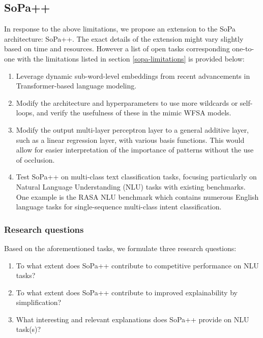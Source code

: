 \subsection{SoPa++}

In response to the above limitations, we propose an extension to the SoPa architecture: SoPa++. The exact details of the extension might vary slightly based on time and resources. However a list of open tasks corresponding one-to-one with the limitations listed in section \ref{sopa-limitations} is provided below:

\begin{enumerate}
  \item Leverage dynamic sub-word-level embeddings from recent advancements in Transformer-based language modeling.
  \item Modify the architecture and hyperparameters to use more wildcards or self-loops, and verify the usefulness of these in the mimic WFSA models.
  \item Modify the output multi-layer perceptron layer to a general additive layer, such as a linear regression layer, with various basis functions. This would allow for easier interpretation of the importance of patterns without the use of occlusion.
  \item Test SoPa++ on multi-class text classification tasks, focusing particularly on Natural Language Understanding (NLU) tasks with existing benchmarks. One example is the RASA NLU benchmark \citep{bocklisch2017rasa} which contains numerous English language tasks for single-sequence multi-class intent classification. 
\end{enumerate}

\subsubsection{Research questions}

Based on the aforementioned tasks, we formulate three research questions:

\begin{enumerate}
  \item To what extent does SoPa++ contribute to competitive performance on NLU tasks?
  \item To what extent does SoPa++ contribute to improved explainability by simplification?
  \item What interesting and relevant explanations does SoPa++ provide on NLU task(s)?
\end{enumerate}



